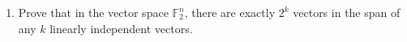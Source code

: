 \documentclass[11pt]{article}
\newcommand{\F}{\ensuremath{\mathbb F}}
\begin{document}
\begin{enumerate}
\item Prove that in the vector space $\F_2^n$, there are exactly $2^k$ vectors in the span of any $k$ linearly independent vectors.



\end{enumerate}
\end{document}
